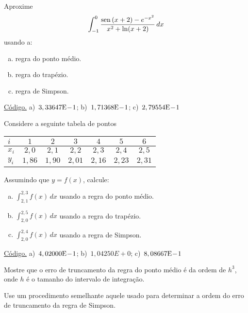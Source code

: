 \begin{exer}\label{exer:int_NC_fun}
  Aproxime
  \begin{equation}
    \int_{-1}^0 \frac{\operatorname{sen}\,(x+2)-e^{-x^2}}{x^2+\ln(x+2)}\,dx
  \end{equation}
usando a:
\begin{enumerate}[a)]
\item regra do ponto médio.
\item regra do trapézio.
\item regra de Simpson.
\end{enumerate}
\end{exer}
\begin{resp}
  \ifisoctave 
  \href{https://github.com/phkonzen/notas/blob/master/src/MatematicaNumerica/cap_integr/dados/exer_int_NC_fun/exer_int_NC_fun.m}{Código.} 
  \fi
  a)~$3,33647\mathrm{E}\!-\!1$; b)~$1,71368\mathrm{E}\!-\!1$; c)~$2,79554\mathrm{E}\!-\!1$
\end{resp}

\begin{exer}\label{exer:int_NC_tab}
  Considere a seguinte tabela de pontos
  \begin{center}
    \begin{tabular}{l|cccccc}
      $i$ & $1$ & $2$ & $3$ & $4$ & $5$ & $6$ \\\hline
      $x_i$ & $2,0$ & $2,1$ & $2,2$ & $2,3$ & $2,4$ & $2,5$ \\
      $y_i$ & $1,86$ & $1,90$ & $2,01$ & $2,16$ & $2,23$ & $2,31$ \\\hline
    \end{tabular}
  \end{center}
Assumindo que $y = f(x)$, calcule:
\begin{enumerate}[a)]
\item $\displaystyle \int_{2,1}^{2,3} f(x)\,dx$ usando a regra do ponto médio.
\item $\displaystyle \int_{2,0}^{2,5} f(x)\,dx$ usando a regra do trapézio.
\item $\displaystyle \int_{2,0}^{2,4} f(x)\,dx$ usando a regra de Simpson.
\end{enumerate}
\end{exer}
\begin{resp}
  \ifisoctave 
  \href{https://github.com/phkonzen/notas/blob/master/src/MatematicaNumerica/cap_integr/dados/exer_int_NC_tab/exer_int_NC_tab.m}{Código.} 
  \fi
  a)~$4,02000\mathrm{E}\!-\!1$; b)~$1,04250E+0$; c)~$8,08667\mathrm{E}\!-\!1$
\end{resp}

\begin{exer}\label{exer:trunc_pto_medio}
  Mostre que o erro de truncamento da regra do ponto médio é da ordem de $h^3$, onde $h$ é o tamanho do intervalo de integração.
\end{exer}
\begin{resp}
  Use um procedimento semelhante aquele usado para determinar a ordem do erro de truncamento da regra de Simpson.
\end{resp}

